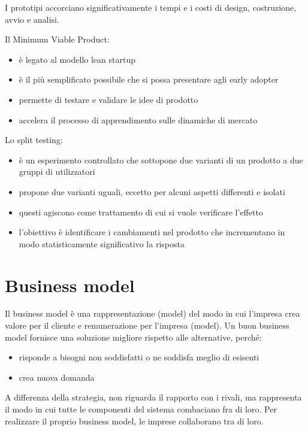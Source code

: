 \documentclass[answers, a4paper, 11pt]{exam}
\begin{document}
I prototipi accorciano significativamente i tempi e i costi di design, costruzione, avvio e analisi.

Il Minimum Viable Product:

\begin{itemize}
    \item è legato al modello lean startup
    \item è il più semplificato possibile che si possa presentare agli early adopter
    \item permette di testare e validare le idee di prodotto
    \item accelera il processo di apprendimento sulle dinamiche di mercato
\end{itemize}

Lo split testing:

\begin{itemize}
    \item è un esperimento controllato che sottopone due varianti di un prodotto a due gruppi di utilizzatori
    \item propone due varianti uguali, eccetto per alcuni aspetti differenti e isolati
    \item questi agiscono come trattamento di cui si vuole verificare l'effetto
    \item l'obiettivo è identificare i cambiamenti nel prodotto che incrementano in modo statisticamente significativo la risposta 
\end{itemize}

\section{Business model}

Il business model è una rappresentazione (model) del modo in cui l'impresa crea valore per il cliente e remunerazione per l'impresa (model).
Un buon business model fornisce una soluzione migliore rispetto alle alternative, perché:

\begin{itemize}
    \item risponde a bisogni non soddisfatti o ne soddisfa meglio di esisenti
    \item crea nuova domanda
\end{itemize}

A differenza della strategia, non riguarda il rapporto con i rivali, ma rappresenta il modo in cui tutte le componenti del sistema combaciano fra di loro.
Per realizzare il proprio business model, le imprese collaborano tra di loro.
\end{document}
